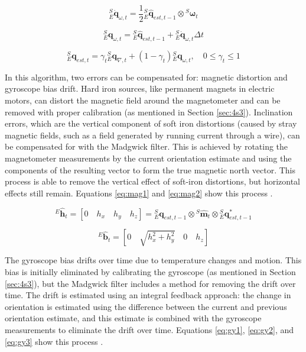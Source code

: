 \documentclass[12pt,a4paper]{report}
\begin{document}
\begin{equation} \label{eq:gyr}
	{}^S_E\dot{\mathbf{q}}_{\omega,t} = \frac{1}{2} 	{}^S_E\hat{\mathbf{q}}_{est,t-1} \otimes {}^S\boldsymbol{\omega}_t
\end{equation}

\begin{equation} \label{eq:gyr2}
	{}^S_E\mathbf{q}_{\omega,t} = {}^S_E\hat{\mathbf{q}}_{est,t-1} + {}^S_E\dot{\mathbf{q}}_{\omega,t} \Delta t
\end{equation}

\begin{equation} \label{eq:comb}
	{}^S_E\mathbf{q}_{est,t} = \gamma_t {}^S_E\mathbf{q}_{\nabla,t} + (1 - \gamma_t) 	{}^S_E\mathbf{q}_{\omega,t}, \quad 0 \leq \gamma_t \leq 1
\end{equation}

In this algorithm, two errors can be compensated for: magnetic distortion and gyroscope bias drift. Hard iron sources, like permanent magnets in electric motors, can distort the magnetic field around the magnetometer and can be removed with proper calibration (as mentioned in Section \ref{sec:4s3}). Inclination errors, which are the vertical component of soft iron distortions (caused by stray magnetic fields, such as a field generated by running current through a wire), can be compensated for with the Madgwick filter. This is achieved by rotating the magnetometer measurements by the current orientation estimate and using the components of the resulting vector to form the true magnetic north vector. This process is able to remove the vertical effect of soft-iron distortions, but horizontal effects still remain. Equations \ref{eq:mag1} and \ref{eq:mag2} show this process \cite{madgwick}.

\begin{equation} \label{eq:mag1}
	^E\hat{\mathbf{h}}_t = \left[0 \quad h_x \quad h_y \quad h_z\right] = {}^S_E\mathbf{q}_{est,t-1} \otimes {}^S\hat{\mathbf{m}}_t \otimes {}^S_E\mathbf{q}_{est,t-1}^*
\end{equation}

\begin{equation} \label{eq:mag2}
	^E\hat{\mathbf{b}}_t = \left[0 \quad \sqrt{h_x^2 + h_y^2} \quad 0 \quad h_z\right]
\end{equation}

The gyroscope bias drifts over time due to temperature changes and motion. This bias is initially eliminated by calibrating the gyroscope (as mentioned in Section \ref{sec:4s3}), but the Madgwick filter includes a method for removing the drift over time. The drift is estimated using an integral feedback approach: the change in orientation is estimated using the difference between the current and previous orientation estimate, and this estimate is combined with the gyroscope measurements to eliminate the drift over time. Equations \ref{eq:gy1}, \ref{eq:gy2}, and \ref{eq:gy3} show this process \cite{madgwick}.
\end{document}
